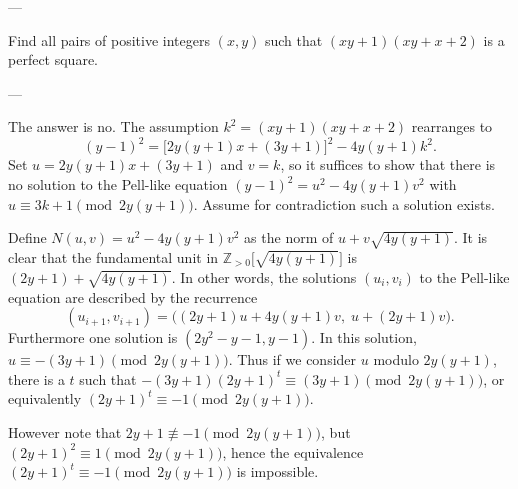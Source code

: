 
---

Find all pairs of positive integers $(x,y)$ such that $(xy+1)(xy+x+2)$ is a perfect square.

---

The answer is no. The assumption $k^2=(xy+1)(xy+x+2)$ rearranges to \[(y-1)^2=\big[2y(y+1)x+(3y+1)\big]^2-4y(y+1)k^2.\]
Set $u=2y(y+1)x+(3y+1)$ and $v=k$, so it suffices to show that there is no solution to the Pell-like equation $(y-1)^2=u^2-4y(y+1)v^2$ with $u\equiv3k+1\pmod{2y(y+1)}$. Assume for contradiction such a solution exists.

Define $N(u,v)=u^2-4y(y+1)v^2$ as the norm of $u+v\sqrt{4y(y+1)}$. It is clear that the fundamental unit in $\mathbb Z_{>0}\big[\sqrt{4y(y+1)}\big]$ is $(2y+1)+\sqrt{4y(y+1)}$. In other words, the solutions $(u_i,v_i)$ to the Pell-like equation are described by the recurrence \[(u_{i+1},v_{i+1})=\Big( (2y+1)u+4y(y+1)v,\;u+(2y+1)v\Big).\]
Furthermore one solution is $(2y^2-y-1,y-1)$. In this solution, $u\equiv-(3y+1)\pmod{2y(y+1)}$. Thus if we consider $u$ modulo $2y(y+1)$, there is a $t$ such that $-(3y+1)(2y+1)^t\equiv(3y+1)\pmod{2y(y+1)}$, or equivalently $(2y+1)^t\equiv-1\pmod{2y(y+1)}$.

However note that $2y+1\not\equiv-1\pmod{2y(y+1)}$, but $(2y+1)^2\equiv1\pmod{2y(y+1)}$, hence the equivalence $(2y+1)^t\equiv-1\pmod{2y(y+1)}$ is impossible.
